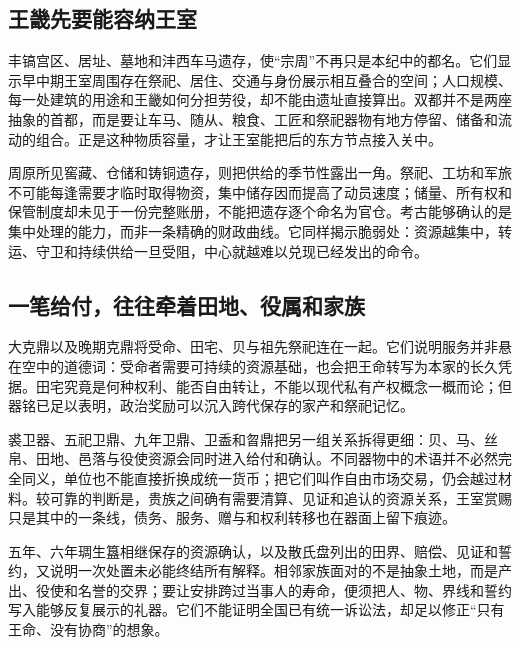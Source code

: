 \subsection{王畿先要能容纳王室}

丰镐宫区、居址、墓地和沣西车马遗存，使“宗周”不再只是本纪中的都名。它们显示早中期王室周围存在祭祀、居住、交通与身份展示相互叠合的空间；人口规模、每一处建筑的用途和王畿如何分担劳役，却不能由遗址直接算出。双都并不是两座抽象的首都，而是要让车马、随从、粮食、工匠和祭祀器物有地方停留、储备和流动的组合。正是这种物质容量，才让王室能把后的东方节点接入关中。

周原所见窖藏、仓储和铸铜遗存，则把供给的季节性露出一角。祭祀、工坊和军旅不可能每逢需要才临时取得物资，集中储存因而提高了动员速度；储量、所有权和保管制度却未见于一份完整账册，不能把遗存逐个命名为官仓。考古能够确认的是集中处理的能力，而非一条精确的财政曲线。它同样揭示脆弱处：资源越集中，转运、守卫和持续供给一旦受阻，中心就越难以兑现已经发出的命令。

\subsection{一笔给付，往往牵着田地、役属和家族}

大克鼎以及晚期克鼎将受命、田宅、贝与祖先祭祀连在一起。它们说明服务并非悬在空中的道德词：受命者需要可持续的资源基础，也会把王命转写为本家的长久凭据。田宅究竟是何种权利、能否自由转让，不能以现代私有产权概念一概而论；但器铭已足以表明，政治奖励可以沉入跨代保存的家产和祭祀记忆。

裘卫器、五祀卫鼎、九年卫鼎、卫盉和曶鼎把另一组关系拆得更细：贝、马、丝帛、田地、邑落与役使资源会同时进入给付和确认。不同器物中的术语并不必然完全同义，单位也不能直接折换成统一货币；把它们叫作自由市场交易，仍会越过材料。较可靠的判断是，贵族之间确有需要清算、见证和追认的资源关系，王室赏赐只是其中的一条线，债务、服务、赠与和权利转移也在器面上留下痕迹。

五年、六年琱生簋相继保存的资源确认，以及散氏盘列出的田界、赔偿、见证和誓约，又说明一次处置未必能终结所有解释。相邻家族面对的不是抽象土地，而是产出、役使和名誉的交界；要让安排跨过当事人的寿命，便须把人、物、界线和誓约写入能够反复展示的礼器。它们不能证明全国已有统一诉讼法，却足以修正“只有王命、没有协商”的想象。

